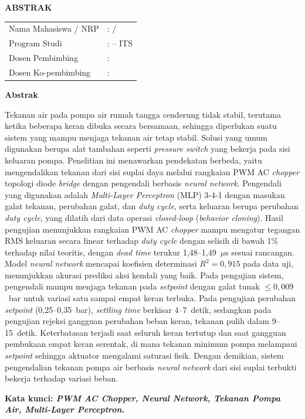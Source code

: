 \begin{center}
  \fontsize{14}{17}\selectfont\textbf{ABSTRAK}
\end{center}


\vspace{2ex}

\begin{center}
  \fontsize{12}{15}\selectfont\textbf{\tatitle{}}
\end{center}

\vspace{2ex}

\noindent
{\bfseries
\begin{tabular}{@{}p{4.3cm}l}
  Nama Mahasiswa / NRP & : \name{} / \nrp{} \\
  Program Studi           & : \department{} \facultyshort{} -- ITS \\
  Dosen Pembimbing     & : \advisor{} \\
  Dosen Ko-pembimbing  & : \coadvisor{} \\
\end{tabular}
}

\vspace{2ex}

\noindent\textbf{Abstrak}

Tekanan air pada pompa air rumah tangga cenderung tidak stabil, terutama
ketika beberapa keran dibuka secara bersamaan, sehingga diperlukan suatu
sistem yang mampu menjaga tekanan air tetap stabil. Solusi yang umum
digunakan berupa alat tambahan seperti
\emph{pressure switch} yang bekerja pada sisi keluaran pompa. Penelitian ini
menawarkan pendekatan berbeda, yaitu mengendalikan tekanan dari sisi suplai
daya melalui rangkaian PWM AC \emph{chopper} topologi diode \emph{bridge}
dengan pengendali berbasis \emph{neural network}. Pengendali yang digunakan
adalah \emph{Multi-Layer Perceptron} (MLP) 3-4-1 dengan masukan galat
tekanan, perubahan galat, dan \emph{duty cycle}, serta keluaran berupa
perubahan \emph{duty cycle}, yang dilatih dari data operasi \emph{closed-loop}
(\emph{behavior cloning}). Hasil pengujian menunjukkan rangkaian PWM AC \emph{chopper} mampu mengatur
tegangan RMS keluaran secara linear terhadap \emph{duty cycle} dengan selisih
di bawah 1\% terhadap nilai teoritis, dengan \emph{dead time} terukur
1,48--1,49~$\mu$s sesuai rancangan. Model \emph{neural network} mencapai
koefisien determinasi $R^2 = 0{,}915$ pada data uji, menunjukkan akurasi
prediksi aksi kendali yang baik. Pada pengujian sistem, pengendali mampu menjaga tekanan pada \emph{setpoint}
dengan galat tunak $\leq 0{,}009$~bar untuk variasi satu sampai empat keran
terbuka. Pada pengujian perubahan \emph{setpoint} (0,25--0,35~bar),
\emph{settling time} berkisar 4--7~detik, sedangkan pada pengujian rejeksi
gangguan perubahan beban keran, tekanan pulih dalam 9--15~detik. Keterbatasan
terjadi saat seluruh keran tertutup dan saat gangguan pembukaan empat keran
serentak, di mana tekanan minimum pompa melampaui \emph{setpoint} sehingga
aktuator mengalami saturasi fisik. Dengan demikian, sistem pengendalian tekanan
pompa air berbasis \emph{neural network} dari sisi suplai terbukti bekerja
terhadap variasi beban.

\vspace{1ex}
\noindent\textbf{Kata kunci: \emph{PWM AC Chopper, Neural Network, Tekanan Pompa Air, Multi-Layer Perceptron}.}
